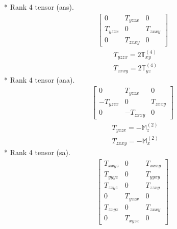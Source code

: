 \documentclass[fleqn,8pt,landscape]{jsarticle}
\begin{document}
* Rank 4 tensor (aas).
\begin{align*}
\begin{bmatrix} 0 & T_{yzzx} & 0 \\ T_{yzzx} & 0 & T_{zxxy} \\ 0 & T_{zxxy} & 0 \end{bmatrix}
\end{align*}
\begin{align*}
& T_{yzzx} = 2 \mathbb{T}_{xy}^{(4)} \\
& T_{zxxy} = 2 \mathbb{T}_{yz}^{(4)}
\end{align*}
* Rank 4 tensor (aaa).
\begin{align*}
\begin{bmatrix} 0 & T_{yzzx} & 0 \\ - T_{yzzx} & 0 & T_{zxxy} \\ 0 & - T_{zxxy} & 0 \end{bmatrix}
\end{align*}
\begin{align*}
& T_{yzzx} = - \mathbb{M}_{z}^{(2)} \\
& T_{zxxy} = - \mathbb{M}_{x}^{(2)}
\end{align*}
* Rank 4 tensor (sa).
\begin{align*}
\begin{bmatrix} T_{xxyz} & 0 & T_{xxxy} \\ T_{yyyz} & 0 & T_{yyxy} \\ T_{zzyz} & 0 & T_{zzxy} \\ 0 & T_{yzzx} & 0 \\ T_{zxyz} & 0 & T_{zxxy} \\ 0 & T_{xyzx} & 0 \end{bmatrix}
\end{align*}
\end{document}
